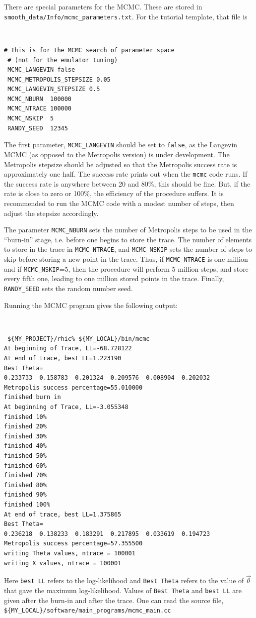 \documentclass[UserManual.tex]{subfiles}
\begin{document}
There are special parameters for the MCMC. These are stored in {\tt smooth\_data/Info/mcmc\_parameters.txt}. For the tutorial template, that file is
{\tt
\begin{verbatim}
# This is for the MCMC search of parameter space
 # (not for the emulator tuning)
 MCMC_LANGEVIN false
 MCMC_METROPOLIS_STEPSIZE 0.05
 MCMC_LANGEVIN_STEPSIZE 0.5
 MCMC_NBURN  100000
 MCMC_NTRACE 100000
 MCMC_NSKIP  5
 RANDY_SEED  12345
\end{verbatim}}
The first parameter, {\tt MCMC\_LANGEVIN} should be set to {\tt false}, as the Langevin MCMC (as opposed to the Metropolis version) is under development. The Metropolis stepsize should be adjusted so that the Metropolis success rate is approximately one half. The success rate prints out when the {\tt mcmc} code runs. If the success rate is anywhere between 20 and 80\%, this should be fine. But, if the rate is close to zero or 100\%, the efficiency of the procedure suffers. It is recommended to run the MCMC code with a modest number of steps, then adjust the stepsize accordingly.

The parameter {\tt MCMC\_NBURN} sets the number of Metropolis steps to be used in the ``burn-in'' stage, i.e. before one begins to store the trace. The number of elements to store in the trace in {\tt MCMC\_NTRACE}, and {\tt MCMC\_NSKIP} sets the number of steps to skip before storing a new point in the trace. Thus, if {\tt MCMC\_NTRACE} is one million and if {\tt MCMC\_NSKIP}=5, then the procedure will perform 5 million steps, and store every fifth one, leading to one million stored points in the trace. Finally, {\tt RANDY\_SEED} sets the random number seed. 

Running the MCMC program gives the following output:
{\tt
\begin{verbatim}
 ${MY_PROJECT}/rhic% ${MY_LOCAL}/bin/mcmc
At beginning of Trace, LL=-68.728122
At end of trace, best LL=1.223190
Best Theta=
0.233733  0.158783  0.201324  0.209576  0.008904  0.202032  
Metropolis success percentage=55.010000
finished burn in
At beginning of Trace, LL=-3.055348
finished 10%
finished 20%
finished 30%
finished 40%
finished 50%
finished 60%
finished 70%
finished 80%
finished 90%
finished 100%
At end of trace, best LL=1.375865
Best Theta=
0.236218  0.138233  0.183291  0.217895  0.033619  0.194723  
Metropolis success percentage=57.355500
writing Theta values, ntrace = 100001
writing X values, ntrace = 100001
\end{verbatim}}
Here {\tt best LL} refers to the log-likelihood and {\tt Best Theta} refers to the value of $\vec{\theta}$ that gave the maximum log-likelihood. Values of {\tt Best Theta} and {\tt best LL} are given after the burn-in and after the trace. One can read the source file, {\tt \$\{MY\_LOCAL\}/software/main\_programs/mcmc\_main.cc}
\end{document}
